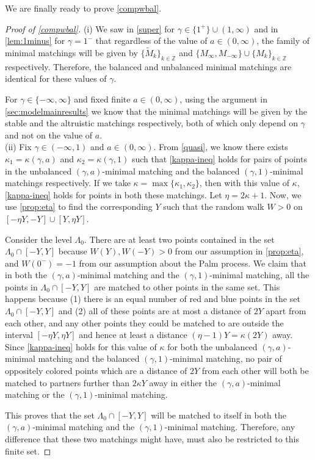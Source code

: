 \documentclass{article}
\newcommand{\Z}{{\mathbb Z}}
\begin{document}
We are finally ready to prove \cref{compwbal}.

\begin{proof}[Proof of \cref{compwbal}]
  (i) We saw in \cref{super} for $\gamma\in\{1^+\}\cup(1,\infty)$ and
  in \cref{lem:1minus} for $\gamma=1^-$ that regardless of the value
  of $a\in(0,\infty)$, the family of minimal matchings will be given
  by $\{\widetilde{M}_k\}_{k\in\Z}$ and
  $\{M_\infty,M_{-\infty}\}\cup\{M_k\}_{k\in\Z}$ respectively.
  Therefore, the balanced and unbalanced minimal matchings are
  identical for these values of $\gamma$.

  For $\gamma\in\{-\infty,\infty\}$ and fixed finite $a\in(0,\infty)$,
  using the argument in \cref{sec:modelmainresults} we know that
  the minimal matchings will be given by the stable and the altruistic
  matchings respectively, both of which only depend on $\gamma $ and
  not on the value of $a$. \\
%
  (ii) Fix $\gamma\in(-\infty,1)$ and $a\in(0,\infty)$. From
  \cref{quasi}, we know there exists $\kappa_1 = \kappa(\gamma,a)$ and
  $\kappa_2 = \kappa(\gamma,1)$ such that
  \eqref{kappa-ineq} holds for pairs of points in the unbalanced $(\gamma,a)$-minimal
  matching and the balanced $(\gamma,1)$-minimal matchings
  respectively. If we take $\kappa =
  \max\{\kappa_1,\kappa_2\} $, then with this value of $\kappa$,
  \eqref{kappa-ineq} holds for points in both these matchings. Let
  $\eta=2\kappa+1$.
  Now, we use \cref{prop:eta} to find the corresponding $Y$ such that
  the random walk $W>0$ on $[-\eta Y,-Y]\cup[Y,\eta Y]$.


  Consider the
  level $\Lambda_0$. There are at least two points
contained in the set $\Lambda_0\cap[-Y,Y]$ because $W(Y),W(-Y)>0$
  from our assumption in \cref{prop:eta},
and $W(0^-)=-1$ from
our assumption about the Palm process.
We claim that in both the $(\gamma,a)$-minimal matching and the
    $(\gamma,1)$-minimal matching, all the points in
    $\Lambda_0\cap[-Y,Y]$ are matched to other points in the same set.
    This happens because (1) there is an equal number of red and
blue points in the set $\Lambda_0\cap[-Y,Y]$ and (2) all of these points are
at most a distance of $2Y$ apart from each other, and any other points
they could be matched to are outside the interval $[-\eta Y,\eta Y]$
and hence at least a distance $(\eta-1)Y = \kappa (2Y)$ away. Since
\eqref{kappa-ineq} holds for this value of $\kappa$ for both the
unbalanced $(\gamma,a)$-minimal matching and the balanced
$(\gamma,1)$-minimal matching, no pair of oppositely colored points which are a
distance of $2Y$ from each other will both be matched to
partners further than $2\kappa Y$ away in either the
  $(\gamma,a)$-minimal matching or the $(\gamma,1)$-minimal matching.


This proves that the set $\Lambda_0\cap[-Y,Y]$ will be matched to
itself in both the $(\gamma,a)$-minimal matching and the
$(\gamma,1)$-minimal matching. Therefore, any difference that these
two matchings might have, must also be restricted to this finite set.
\end{proof}
\end{document}
